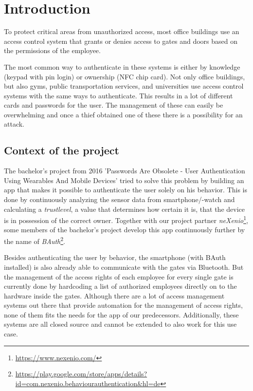 \section{Introduction}

To protect critical areas from unauthorized access, most office buildings use an access control system that grants or denies access to gates and doors based on the permissions of the employee.

The most common way to authenticate in these systems is either by knowledge (keypad with pin login) or ownership (NFC chip card).
Not only office buildings, but also gyms, public transportation services, and universities use access control systems with the same ways to authenticate. This results in a lot of different cards and passwords for the user. The management of these can easily be overwhelming and once a thief obtained one of these there is a possibility for an attack.

\subsection{Context of the project}
\label{Context of the project}

The bachelor's project from 2016 'Passwords Are Obsolete - User Authentication Using Wearables And Mobile Devices' tried to solve this problem by building an app that makes it possible to authenticate the user solely on his behavior. This is done by continuously analyzing the sensor data from smartphone/-watch and calculating a \emph{trustlevel}, a value that determines how certain it is, that the device is in possession of the correct owner.
Together with our project partner \emph{neXenio}\footnote{\url{https://www.nexenio.com/}}, some members of the bachelor's project develop this app continuously further by the name of \emph{BAuth}\footnote{\url{https://play.google.com/store/apps/details?id=com.nexenio.behaviourauthentication&hl=de}}. 

Besides authenticating the user by behavior, the smartphone (with BAuth installed) is also already able to communicate with the gates via Bluetooth. But the management of the access rights of each employee for every single gate is currently done by hardcoding a list of authorized employees directly on to the hardware inside the gates. Although there are a lot of access management systems out there that provide automation for the management of access rights, none of them fits the needs for the app of our predecessors. Additionally, these systems are all closed source and cannot be extended to also work for this use case. 


